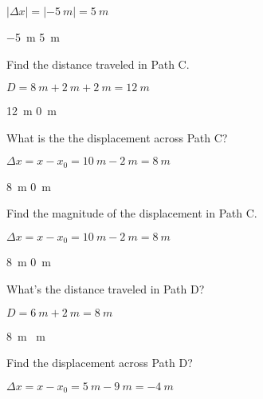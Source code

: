 \documentclass[answers]{exam}
\begin{document}
\begin{questions}
\ifprintanswers
{\color{red} 
$ \left|\Delta x\right| = \left|-\SI{5}{m}\right| = \boxed{\SI{5}{m}}$
}

\smallskip
\fi

\begin{randomizechoices}
    \choice \SI{-5}{m}
    \correctchoice \SI{5}{m}
\end{randomizechoices}


\question
Find the distance traveled in Path C.

\ifprintanswers
{\color{red} 
$D = \SI{8}{m} + \SI{2}{m} + \SI{2}{m} = \SI{12}{m}$
}

\smallskip
\fi


\begin{randomizechoices}
    \correctchoice \SI{12}{m}
    \choice \SI{0}{m}
\end{randomizechoices}


\question
What is the the displacement across Path C?

\ifprintanswers
{\color{red} 
$\Delta x = x - x_0 = \SI{10}{m} - \SI{2}{m} = \boxed{\SI{8}{m}}$
}

\smallskip
\fi


\begin{randomizechoices}
    \correctchoice \SI{8}{m}
    \choice \SI{0}{m}
\end{randomizechoices}


\question
Find the magnitude of the displacement in Path C.

\ifprintanswers
{\color{red} 
$\Delta x = x - x_0 = \SI{10}{m} - \SI{2}{m} = \boxed{\SI{8}{m}}$
}

\smallskip
\fi


\begin{randomizechoices}
    \correctchoice \SI{8}{m}
    \choice \SI{0}{m}
\end{randomizechoices}


\question
What's the distance traveled in Path D?

\ifprintanswers
{\color{red} 
$D = \SI{6}{m} + \SI{2}{m} = \SI{8}{m}$
}

\smallskip
\fi


\begin{randomizechoices}
    \correctchoice \SI{8}{m}
    \choice \SI{}{m}
\end{randomizechoices}

\question
Find the displacement across Path D?

\ifprintanswers
{\color{red} 
$\Delta x = x - x_0 = \SI{5}{m} - \SI{9}{m} = \boxed{-\SI{4}{m}}$
}


\end{questions}
\end{document}
